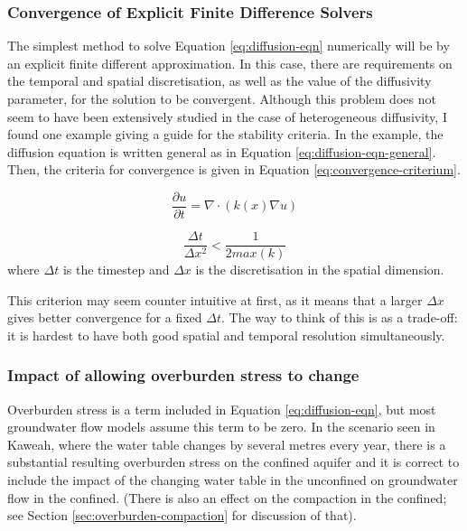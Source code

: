 \documentclass{article}
\begin{document}
\subsubsection{Convergence of Explicit Finite Difference Solvers}
\label{sec:Convergence_gwflow}

The simplest method to solve Equation \ref{eq:diffusion-eqn} numerically will be by an explicit finite different approximation. In this case, there are requirements on the temporal and spatial discretisation, as well as the value of the diffusivity parameter, for the solution to be convergent. Although this problem does not seem to have been extensively studied in the case of heterogeneous diffusivity, I found one example giving a guide for the stability criteria. In the example, the diffusion equation is written general as in Equation \ref{eq:diffusion-eqn-general}. Then, the criteria for convergence is given in Equation \ref{eq:convergence-criterium}.

\begin{equation}
\frac{\partial u}{\partial t} = \nabla \cdot (k(x) \nabla u)
\label{eq:diffusion-eqn-general}
\end{equation}

\begin{equation}
\frac{\Delta t}{\Delta x ^2} < \frac{1}{2 max(k)}
\label{eq:convergence-criterium}
\end{equation}
where $\Delta t$ is the timestep and $\Delta x$ is the discretisation in the spatial dimension.

This criterion may seem counter intuitive at first, as it means that a larger $\Delta x$ gives better convergence for a fixed $\Delta t$. The way to think of this is as a trade-off: it is hardest to have both good spatial and temporal resolution simultaneously.

\subsubsection{Impact of allowing overburden stress to change}
\label{sec:overburden-gwflow}

Overburden stress is a term included in Equation \ref{eq:diffusion-eqn}, but most groundwater flow models assume this term to be zero. In the scenario seen in Kaweah, where the water table changes by several metres every year, there is a substantial resulting overburden stress on the confined aquifer and it is correct to include the impact of the changing water table in the unconfined on groundwater flow in the confined. (There is also an effect on the compaction in the confined; see Section \ref{sec:overburden-compaction} for discussion of that).
\end{document}

